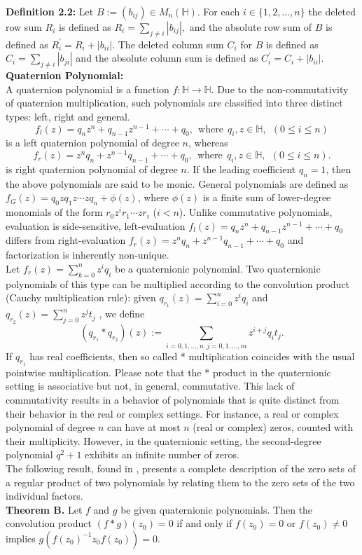 \documentclass [12pt]{article}
\begin{document}
\noindent\textbf{Definition 2.2:}   
Let $B:=(b_{ij})\in M_{n}{(\mathbb{H})}$. For each  $i \in \{1,2, \dots, n\}$
the deleted row sum \( R_i \) is defined as \( R_i = \sum\limits_{j \neq i} |b_{ij}|,\) and the absolute row sum of $B$ is defined as \( R_i^{'} =R_i+|b_{ii}| \).  
The deleted column sum \( C_i \) for $B$ is defined as \( C_i = \sum\limits_{j \neq i} |b_{ji}| \) and the absolute column sum  is defined as \( C_i^{'} =C_i+|b_{ii}| \). \\  


\noindent\textbf{Quaternion Polynomial:}\\
A quaternion polynomial is a function \(f: \mathbb{H} \to \mathbb{H}\). Due to the non-commutativity of quaternion multiplication, such polynomials are classified into three distinct types: left, right and general.\\  
$$f_l(z) = q_n z^n + q_{n-1} z^{n-1} + \cdots + q_0,~ ~\mbox{where} ~~ q_{i}, z \in\mathbb{H},~~ (0 \le i \le n)$$ is a left quaternion polynomial of degree $n$, whereas
$$f_r(z) = z^n q_n + z^{n-1} q_{n-1} + \cdots + q_0 , 
~~\mbox{where}~~ q_{i}, z \in\mathbb{H},~~ (0 \le i \le n).$$ is right quaternion polynomial of degree $n.$ If the leading coefficient $q_{n}=1$, then the above polynomials are said to be monic. General polynomials are defined as \(f_G(z) = q_0 z q_1 z \cdots z q_n + \phi(z)\), where \(\phi(z)\) is a finite sum of lower-degree monomials of the form \(r_0 z^i r_1 \cdots z r_i\) (\(i < n\)). Unlike commutative polynomials, evaluation is side-sensitive, left-evaluation $f_l(z) = q_n z^n + q_{n-1} z^{n-1} + \cdots + q_0$ differs from right-evaluation $f_r(z) = z^n q_n + z^{n-1} q_{n-1} + \cdots + q_0 $ and factorization is inherently non-unique.\\
\indent Let  $f_{r}(z)=\sum_{k=0}^{n}z^iq_i$ be a quaternionic polynomial. Two quaternionic polynomials of this type can be multiplied according to the convolution product (Cauchy multiplication rule): given $q_{r_{1}}(z)=\sum_{i=0}^{n}z^iq_i$ and $q_{r_{2}}(z)=\sum_{j=0}^{n}z^jt_j$ , we define
$$(q_{r_{1}}*q_{r_{2}})(z):=\sum_{i=0,1,\dots, n~~j=0,1,\dots,m}^{}z^{i+j}q_it_j.$$
If $q_{r_{1}}$ has real coefficients, then so called * multiplication coincides with the usual pointwise multiplication.
Please note that the * product in the quaternionic setting is associative but not, in general, commutative. This lack of commutativity results in a behavior of polynomials that is quite distinct from their behavior in the real or complex settings. For instance, a real or complex polynomial of degree $n$ can have at most $n$ (real or complex) zeros, counted with their multiplicity. However, in the quaternionic setting, the second-degree polynomial $q^2+1$ exhibits an infinite number of zeros.\\ 
The following result, found in \cite{GS}, presents a complete description of the zero sets of a regular product of two polynomials by relating them to the zero sets of the two individual factors.\\
\textbf{Theorem B.}{\label{theorem B}} Let $f$ and $g$ be given quaternionic polynomials. Then the convolution product $(f*g)(z_0)=0$ if and only if $f(z_0)=0$ or $f(z_0)\neq 0$ implies $g(f(z_0)^{-1}z_0f(z_0))=0$.\\
\end{document}
